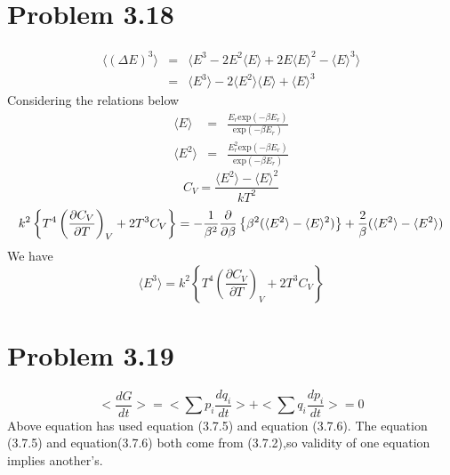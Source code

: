 \documentclass{article}
\begin{document}
\section*{Problem 3.18}
\begin{eqnarray*}
\langle(\Delta E)^3\rangle&=&\langle E^3-2E^2\langle E\rangle +2E\langle E\rangle ^2-\langle E\rangle ^3\rangle \\&=&\langle E^3\rangle -2\langle E^2\rangle \langle E\rangle +\langle E\rangle^3
\end{eqnarray*}
Considering the relations below
\begin{eqnarray*}
\langle E\rangle &=&\frac{E_r\mathrm{exp}(-\beta E_r)}{\mathrm{exp}(-\beta E_r)}\\
\langle E^2\rangle &=&\frac{E_r^2\mathrm{exp}(-\beta E_r)}{\mathrm{exp}(-\beta E_r)}
\end{eqnarray*}
\begin{equation*}
C_V=\frac{\langle E^2\rangle-\langle E\rangle^2}{kT^2}
\end{equation*}
\begin{equation*}
k^2\left\{T^4\left(\frac{\partial C_V}{\partial T}\right)_V+2T^3C_V\right\}=-\frac{1}{\beta^2}\frac{\partial}{\partial \beta}\left\{\beta^2(\langle E^2\rangle-\langle E\rangle^2)\right\}+\frac{2}{\beta}(\langle E^2\rangle-\langle E^2\rangle)\\
\end{equation*}
We have
\begin{equation*}
\langle E^3\rangle=k^2\left\{T^4\left(\frac{\partial C_V}{\partial T}\right)_V+2T^3C_V\right\}
\end{equation*}


\section*{Problem 3.19}
	\begin{equation*}
		<\frac{dG}{dt}>=<\sum p_i \frac{dq_i}{dt}>+<\sum q_i \frac{dp_i}{dt}>=0
	\end{equation*}
	Above equation has used equation (3.7.5) and equation (3.7.6).
	The equation (3.7.5) and equation(3.7.6)  both come from (3.7.2),so validity of one equation implies another's.
	
\end{document}
